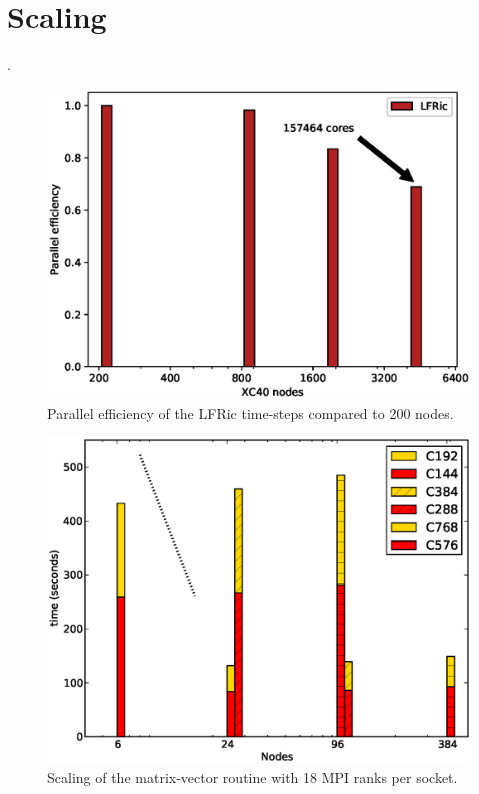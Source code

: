 \documentclass[review,times]{elsarticle}
\begin{document}
\section{\label{sec:scal}Scaling}.
\begin{figure}
  \begin{center}
    \includegraphics[width=0.9\linewidth]{scale.eps}
    \caption{\label{fig:scale_PE}Parallel efficiency of the LFRic 
      time-steps compared to 200 nodes.}
  \end{center}
\end{figure}

\begin{figure}
  \begin{center}
    \includegraphics[width=0.9\linewidth]{strong_mv_T1.eps}
    \caption{\label{fig:scale_T1}Scaling of the matrix-vector routine 
      with 18 MPI ranks per socket.}
  \end{center}
\end{figure}
\end{document}
